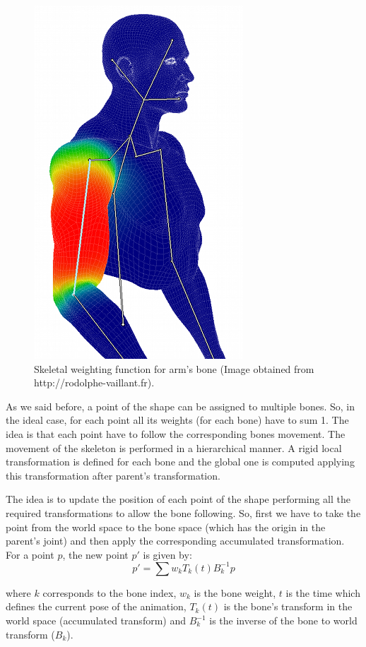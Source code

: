 \documentclass[10pt]{article} %
\begin{document}
\begin{figure}
\centering
\includegraphics[scale=0.35]{skel.png}
\caption{Skeletal weighting function for arm's bone (Image obtained from http://rodolphe-vaillant.fr).}
\label{skel}
\end{figure}

As we said before, a point of the shape can be assigned to multiple bones. So, in the ideal case, for each point all its weights (for each bone) have to sum 1. The idea is that each point have to follow the corresponding bones movement. The movement of the skeleton is performed in a hierarchical manner. A rigid local transformation is defined for each bone and the global one is computed applying this transformation after parent's transformation. 

The idea is to update the position of each point of the shape performing all the required transformations to allow the bone following. So, first we have to take the point from the world space to the bone space (which has the origin in the parent's joint) and then apply the corresponding accumulated transformation. For a point $p$, the new point $p'$ is given by:
\[
	p' = \sum w_k T_k(t) B_k^{-1} p
\]

where $k$ corresponds to the bone index, $w_k$ is the bone weight, $t$ is the time which defines the current pose of the animation, $T_k(t)$ is the bone's transform in the world space (accumulated transform) and $B_k^{-1}$ is the inverse of the bone to world transform ($B_k$).
\end{document}
